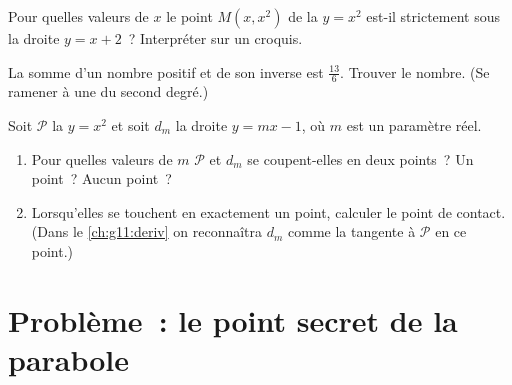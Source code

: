 \begin{exercise}[$\star\star$]\label{exo:g11:quad:9}
Pour quelles valeurs de $x$ le point $M(x, x^2)$ de la 
$y = x^2$ est-il strictement sous la droite $y = x + 2$~? Interpréter sur
un croquis.
\end{exercise}

\begin{exercise}[$\star\star$]\label{exo:g11:quad:10}
La somme d'un nombre positif et de son inverse est $\frac{13}{6}$.
Trouver le nombre. (Se ramener à une  du second degré.)
\end{exercise}

\begin{exercise}[$\star\star\star$]\label{exo:g11:quad:11}
Soit $\mathcal P$ la  $y = x^2$ et soit $d_m$ la droite
$y = mx - 1$, où $m$ est un paramètre réel.
\begin{enumerate}
  \item Pour quelles valeurs de $m$ $\mathcal P$ et $d_m$ se coupent-elles
        en deux points~? Un point~? Aucun point~?
  \item Lorsqu'elles se touchent en exactement un point, calculer le
        point de contact. (Dans le \cref{ch:g11:deriv} on reconnaîtra
        $d_m$ comme la tangente à $\mathcal P$ en ce point.)
\end{enumerate}
\end{exercise}

\section{Problème~: le point secret de la parabole}


